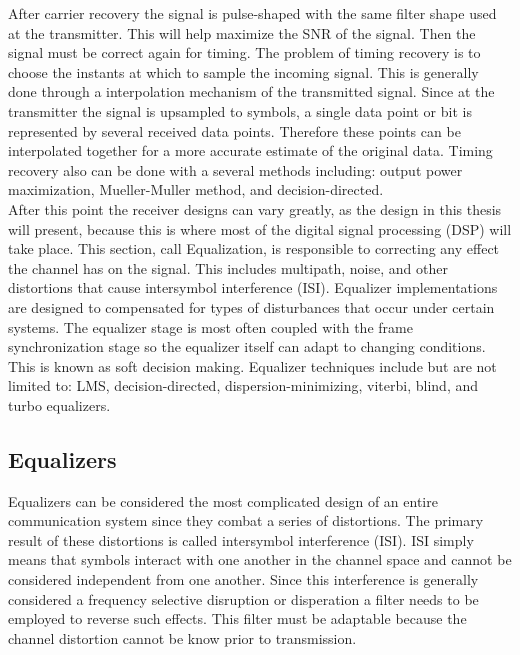 \documentclass[11pt]{mvlthesis}
\begin{document}
After carrier recovery the signal is pulse-shaped with the same filter shape used at the transmitter.  This will help maximize the SNR of the signal.  Then the signal must be correct again for timing.  The problem of timing recovery is to choose the instants at which to sample the incoming signal.  This is generally done through a interpolation mechanism of the transmitted signal.  Since at the transmitter the signal is upsampled to symbols, a single data point or bit is represented by several received data points.  Therefore these points can be interpolated together for a more accurate estimate of the original data.  Timing recovery also can be done with a several methods including: output power maximization, Mueller-Muller method, and decision-directed.\\

After this point the receiver designs can vary greatly, as the design in this thesis will present, because this is where most of the digital signal processing (DSP) will take place.  This section, call Equalization, is responsible to correcting any effect the channel has on the signal. This includes multipath, noise, 	and other distortions that cause intersymbol interference (ISI).  Equalizer implementations are designed to compensated for types of disturbances that occur under certain systems.  The equalizer stage is most often coupled with the frame synchronization stage so the equalizer itself can adapt to changing conditions.  This is known as soft decision making.  Equalizer techniques include but are not limited to: LMS, decision-directed, dispersion-minimizing, viterbi, blind, and turbo equalizers.\\  

\subsection{Equalizers}

Equalizers can be considered the most complicated design of an entire communication system since they combat a series of distortions.  The primary result of these distortions is called intersymbol interference (ISI).  ISI simply means that symbols interact with one another in the channel space and cannot be considered independent from one another.  Since this interference is generally considered a frequency selective disruption or disperation a filter needs to be employed to reverse such effects.  This filter must be adaptable because the channel distortion cannot be know prior to transmission.\\  
\end{document}
